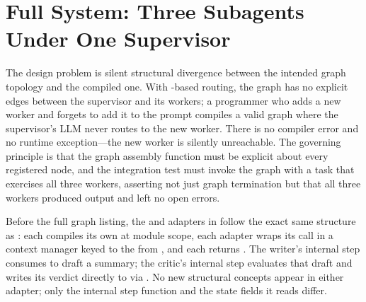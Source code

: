 \section{Full System: Three Subagents Under One Supervisor}
\label{sec:sup-full}

The design problem is silent structural divergence between the intended
graph topology and the compiled one. With -based routing,
the graph has no explicit edges between the supervisor and its workers; a
programmer who adds a new worker and forgets to add it to the
 prompt compiles a valid graph where the supervisor's
LLM never routes to the new worker. There is no compiler error and no
runtime exception---the new worker is silently unreachable. The governing
principle is that the graph assembly function must be explicit about every
registered node, and the integration test must invoke the graph with a task
that exercises all three workers, asserting not just graph termination but
that all three workers produced output and left no open errors.

Before the full graph listing, the  and
 adapters in  follow the exact same
structure as : each compiles its own
 at module scope, each adapter wraps its 
call in a  context manager keyed to the
 from , and each
returns . The writer's
internal step consumes 
to draft a summary; the critic's internal step evaluates that draft and
writes its verdict directly to  via
.
No new structural concepts appear in either adapter; only the internal step
function and the state fields it reads differ.

